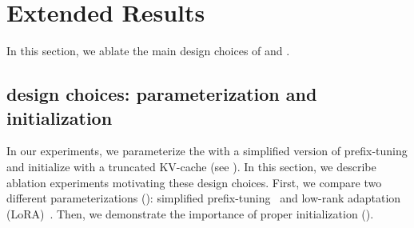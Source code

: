 

\section{Extended Results}
\label{app:results}
In this section, we ablate the main design choices of \artifacts and \method.
\subsection{\artifact design choices: parameterization and initialization}
\label{app:results-parameterization}
In our experiments, we parameterize the \artifact with a simplified version of prefix-tuning and initialize with a truncated KV-cache (see ). In this section, we describe ablation experiments motivating these design choices.
First, we compare two different \artifact parameterizations (): simplified prefix-tuning~\cite{li2021prefix} and low-rank adaptation (LoRA)~\cite{hu2022lora}.
Then, we demonstrate the importance of proper \artifact   initialization ().
